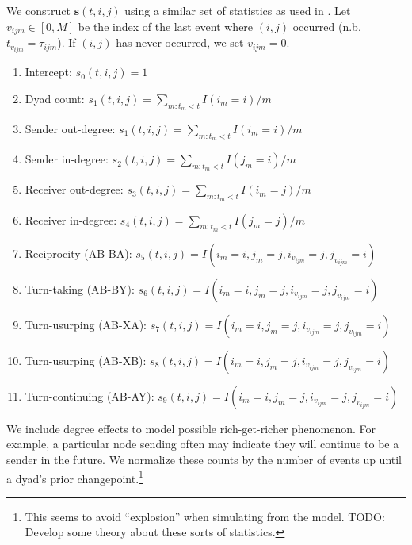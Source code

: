 \documentclass[11pt]{article}
\begin{document}
We construct $\mathbf{s}(t,i,j)$ using a similar set of statistics as used in \cite{Butts2008,Vu2011}. Let $v_{ijm} \in [0,M]$ be the index of the last event where $(i,j)$ occurred (n.b. $t_{v_{ijm}} = \tau_{ijm}$). If $(i,j)$ has never occurred, we set $v_{ijm}=0$.  
\begin{enumerate}
\item Intercept: $s_{0}(t,i,j) = 1$
\item Dyad count: $s_{1}(t,i,j) = \sum_{m:t_m<t} I(i_m=i) / m$
\item Sender out-degree: $s_{1}(t,i,j) = \sum_{m:t_m<t} I(i_m=i) / m$
\item Sender in-degree: $s_{2}(t,i,j) = \sum_{m:t_m<t} I(j_m=i) / m$
\item Receiver out-degree: $s_{3}(t,i,j) = \sum_{m:t_m<t} I(i_m=j)/m$
\item Receiver in-degree: $s_{4}(t,i,j) = \sum_{m:t_m<t} I(j_m=j)/m$
\item Reciprocity (AB-BA): $s_{5}(t,i,j) = I(i_m=i,j_m=j,i_{v_{ijm}}=j,j_{v_{ijm}}=i)$
\item Turn-taking (AB-BY): $s_{6}(t,i,j) = I(i_m=i,j_m=j,i_{v_{ijm}}=j,j_{v_{ijm}}=i)$
\item Turn-usurping (AB-XA): $s_{7}(t,i,j) = I(i_m=i,j_m=j,i_{v_{ijm}}=j,j_{v_{ijm}}=i)$
\item Turn-usurping (AB-XB): $s_{8}(t,i,j) = I(i_m=i,j_m=j,i_{v_{ijm}}=j,j_{v_{ijm}}=i)$
\item Turn-continuing (AB-AY): $s_{9}(t,i,j) =  I(i_m=i,j_m=j,i_{v_{ijm}}=j,j_{v_{ijm}}=i)$
\end{enumerate}

We include degree effects to model possible rich-get-richer phenomenon.  For example, a particular node sending often may indicate they will continue to be a sender in the future.  We normalize these counts by the number of events up until a dyad's prior changepoint.\footnote{This seems to avoid ``explosion'' when simulating from the model.  TODO: Develop some theory about these sorts of statistics.}
\end{document}
